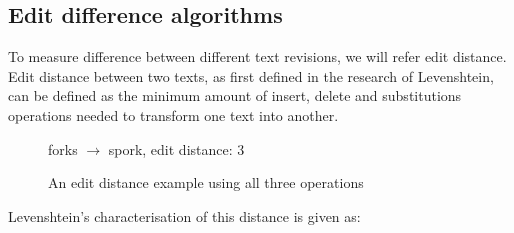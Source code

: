 \documentclass[a4paper,11pt,twoside,notitlepage]{article}
\newcommand\CellText[2]{%
          \node[texto,left=of mat#1,anchor=east]
          at (mat#1.west)
          {\large #2};
        }
\newcommand\SlText[2]{%
          \node[texto,left=of mat#1,anchor=west,rotate=50]
          at ([xshift=1.5ex,yshift=1ex]mat#1.north)
          {\large #2};
        }
\begin{document}
        \subsection{Edit difference algorithms}
        To measure difference between different text revisions, we
        will refer edit distance. Edit distance between two texts,
        as first defined in the research of Levenshtein,\cite{Levenshtein1966} can be defined as the minimum
        amount of insert, delete and substitutions operations needed
        to transform one text into another.

        \begin{figure}[h]
          \centering
                  

          \vspace{3 mm}

          forks $\rightarrow$ spork, edit distance: 3
          
          \caption{An edit distance example using all three
            operations}
          \label{fig:fork-spork}
        \end{figure}

        Levenshtein's characterisation of this distance is given as:
        
\end{document}
